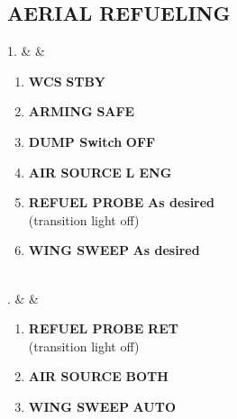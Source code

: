 \documentclass[fontInter]{TechCheck}
\begin{document}
	\subsection{AERIAL REFUELING}
	\begin{listlongtable}
		1. &  &
		\begin{minipage}[t]{\linewidth}
			\vspace{-7pt}
			\begin{enumerate}
				\item \textbf{WCS} \dotfill \textbf{STBY}
				\item \textbf{ARMING} \dotfill \textbf{SAFE}
				\item \textbf{DUMP Switch} \dotfill \textbf{OFF}
				\item \textbf{AIR SOURCE} \dotfill \textbf{L ENG}
				\item \textbf{REFUEL PROBE} \dotfill \textbf{As desired} \\
				\hfill (transition light off)
				\item \textbf{WING SWEEP} \dotfill \textbf{As desired}
			\end{enumerate}
		\end{minipage} \\
		. &  &
		\begin{minipage}[t]{\linewidth}
			\vspace{-7pt}
			\begin{enumerate}
				\item \textbf{REFUEL PROBE} \dotfill \textbf{RET} \\
				\hfill (transition light off)
				\item \textbf{AIR SOURCE} \dotfill \textbf{BOTH}
				\item \textbf{WING SWEEP} \dotfill \textbf{AUTO}
			\end{enumerate}
		\end{minipage} \\
	\end{listlongtable}

	\clearpage
\end{document}
